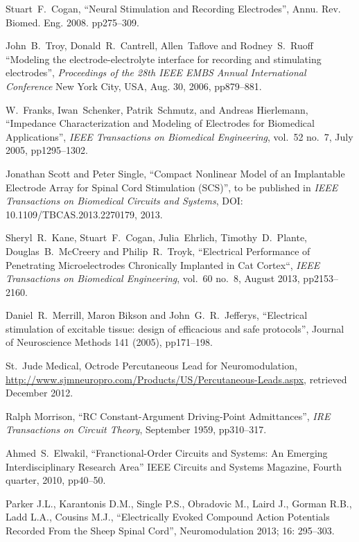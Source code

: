 \documentclass[10pt,final,journal]{IEEEtran}
\begin{document}
\begin{thebibliography}{99}

    Stuart~F.~Cogan,
    ``Neural Stimulation and Recording Electrodes'',
    Annu. Rev. Biomed. Eng. 2008. pp275--309.

    John~B.~Troy, Donald~R.~Cantrell, Allen~Taflove and Rodney~S.~Ruoff
    ``Modeling the electrode-electrolyte interface for recording and stimulating electrodes'',
    {\em Proceedings of the 28th IEEE EMBS Annual International Conference}
    New York City, USA, Aug. 30, 2006, pp879--881.

W.~Franks, Iwan~Schenker, Patrik~Schmutz, and Andreas Hierlemann,
``Impedance Characterization and Modeling of Electrodes for Biomedical Applications'',
\emph{IEEE Transactions on Biomedical Engineering},
vol.~52 no.~7, July 2005, pp1295--1302.

Jonathan Scott and Peter Single,
``Compact Nonlinear Model of an Implantable Electrode Array for Spinal Cord Stimulation (SCS)'',
to be published in
{\em IEEE Transactions on Biomedical Circuits and Systems},
DOI: 10.1109/TBCAS.2013.2270179, 2013.

Sheryl~R.~Kane, Stuart~F.~Cogan, Julia~Ehrlich, Timothy~D.~Plante, Douglas~B.~McCreery and Philip~R.~Troyk,
``Electrical Performance of Penetrating Microelectrodes Chronically Implanted in Cat Cortex``,
{\em IEEE Transactions on Biomedical Engineering},
vol.~60 no.~8, August 2013, pp2153--2160.

Daniel~R.~Merrill, Maron Bikson and John~G.~R.\ Jefferys,
``Electrical stimulation of excitable tissue: design of efficacious and safe protocols'',
Journal of Neuroscience Methods 141 (2005), pp171--198.

St.~Jude Medical, Octrode Percutaneous Lead for Neuromodulation,
\url{http://www.sjmneuropro.com/Products/US/Percutaneous-Leads.aspx},
retrieved December 2012.

Ralph Morrison,
``RC Constant-Argument Driving-Point Admittances'',
{\em IRE Transactions on Circuit Theory},
September 1959, pp310--317.

Ahmed~S.~Elwakil,
``Franctional-Order Circuits and Systems: An Emerging Interdisciplinary Research Area''
IEEE Circuits and Systems Magazine, Fourth quarter, 2010, pp40--50.

Parker J.L., Karantonis D.M., Single P.S., Obradovic M., Laird J., Gorman R.B., Ladd L.A., Cousins M.J.,
``Electrically Evoked Compound Action Potentials Recorded From the Sheep Spinal Cord'', 
Neuromodulation 2013; 16: 295--303.


\end{thebibliography}
\end{document}
